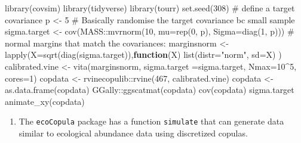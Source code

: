 \documentclass[
  letterpaper,
]{krantz}
\newenvironment{Shaded}{\begin{snugshade}}{\end{snugshade}}
\newcommand{\AttributeTok}[1]{\textcolor[rgb]{0.40,0.45,0.13}{#1}}
\newcommand{\CommentTok}[1]{\textcolor[rgb]{0.37,0.37,0.37}{#1}}
\newcommand{\ControlFlowTok}[1]{\textcolor[rgb]{0.00,0.23,0.31}{\textbf{#1}}}
\newcommand{\DecValTok}[1]{\textcolor[rgb]{0.68,0.00,0.00}{#1}}
\newcommand{\FunctionTok}[1]{\textcolor[rgb]{0.28,0.35,0.67}{#1}}
\newcommand{\NormalTok}[1]{\textcolor[rgb]{0.00,0.23,0.31}{#1}}
\newcommand{\OtherTok}[1]{\textcolor[rgb]{0.00,0.23,0.31}{#1}}
\newcommand{\SpecialCharTok}[1]{\textcolor[rgb]{0.37,0.37,0.37}{#1}}
\newcommand{\StringTok}[1]{\textcolor[rgb]{0.13,0.47,0.30}{#1}}
\providecommand{\tightlist}{%
  \setlength{\itemsep}{0pt}\setlength{\parskip}{0pt}}\usepackage{longtable,booktabs,array}
\begin{document}
\begin{Shaded}
\begin{Highlighting}[]
\FunctionTok{library}\NormalTok{(covsim)}
\FunctionTok{library}\NormalTok{(tidyverse)}
\FunctionTok{library}\NormalTok{(tourr)}
\FunctionTok{set.seed}\NormalTok{(}\DecValTok{308}\NormalTok{) }\CommentTok{\# define a target covariance}
\NormalTok{p }\OtherTok{\textless{}{-}} \DecValTok{5}
\CommentTok{\# Basically randomise the target covariance bc small sample}
\NormalTok{sigma.target }\OtherTok{\textless{}{-}} \FunctionTok{cov}\NormalTok{(MASS}\SpecialCharTok{::}\FunctionTok{mvrnorm}\NormalTok{(}\DecValTok{10}\NormalTok{, }\AttributeTok{mu=}\FunctionTok{rep}\NormalTok{(}\DecValTok{0}\NormalTok{, p), }\AttributeTok{Sigma=}\FunctionTok{diag}\NormalTok{(}\DecValTok{1}\NormalTok{, p)))}
\CommentTok{\# normal margins that match the covariances:}
\NormalTok{marginsnorm }\OtherTok{\textless{}{-}} \FunctionTok{lapply}\NormalTok{(}\AttributeTok{X=}\FunctionTok{sqrt}\NormalTok{(}\FunctionTok{diag}\NormalTok{(sigma.target)),}\ControlFlowTok{function}\NormalTok{(X) }\FunctionTok{list}\NormalTok{(}\AttributeTok{distr=}\StringTok{"norm"}\NormalTok{, }\AttributeTok{sd=}\NormalTok{X) )}
\NormalTok{calibrated.vine }\OtherTok{\textless{}{-}} \FunctionTok{vita}\NormalTok{(marginsnorm, }\AttributeTok{sigma.target =}\NormalTok{sigma.target, }\AttributeTok{Nmax=}\DecValTok{10}\SpecialCharTok{\^{}}\DecValTok{5}\NormalTok{, }\AttributeTok{cores=}\DecValTok{1}\NormalTok{)}
\NormalTok{copdata }\OtherTok{\textless{}{-}}\NormalTok{ rvinecopulib}\SpecialCharTok{::}\FunctionTok{rvine}\NormalTok{(}\DecValTok{467}\NormalTok{, calibrated.vine)}
\NormalTok{copdata }\OtherTok{\textless{}{-}} \FunctionTok{as.data.frame}\NormalTok{(copdata)}
\NormalTok{GGally}\SpecialCharTok{::}\FunctionTok{ggscatmat}\NormalTok{(copdata)}
\FunctionTok{cov}\NormalTok{(copdata)}
\NormalTok{sigma.target}
\FunctionTok{animate\_xy}\NormalTok{(copdata)}
\end{Highlighting}
\end{Shaded}

\begin{enumerate}
\def\labelenumi{\alph{enumi}.}
\setcounter{enumi}{1}
\tightlist
\item
  The \texttt{ecoCopula} package has a function \texttt{simulate} that
  can generate data similar to ecological abundance data using
  discretized copulas.
\end{enumerate}
\end{document}
